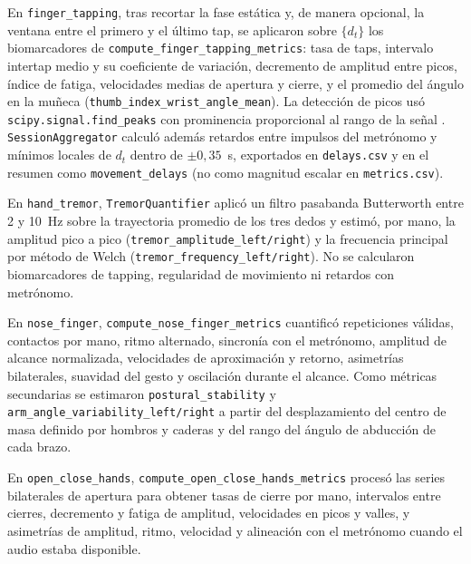 \begin{sloppypar}
En \texttt{finger\_tapping}, tras recortar la fase estática y, de manera opcional, la ventana entre el primero y el último tap, se aplicaron sobre $\{d_t\}$ los biomarcadores de \texttt{compute\_\allowbreak{}finger\_\allowbreak{}tapping\_\allowbreak{}metrics}: tasa de taps, intervalo intertap medio y su coeficiente de variación, decremento de amplitud entre picos, índice de fatiga, velocidades medias de apertura y cierre, y el promedio del ángulo en la muñeca (\texttt{thumb\_\allowbreak{}index\_\allowbreak{}wrist\_\allowbreak{}angle\_\allowbreak{}mean}). La detección de picos usó \texttt{scipy.\allowbreak{}signal.\allowbreak{}find\_\allowbreak{}peaks} con prominencia proporcional al rango de la señal \citep{sibley2021video,acevedo2025visionmd}. \texttt{SessionAggregator} calculó además retardos entre impulsos del metrónomo y mínimos locales de $d_t$ dentro de $\pm 0{,}35$~s, exportados en \texttt{delays.csv} y en el resumen como \texttt{movement\_\allowbreak{}delays} (no como magnitud escalar en \texttt{metrics.csv}).

En \texttt{hand\_tremor}, \texttt{TremorQuantifier} aplicó un filtro pasabanda Butterworth entre 2 y 10~Hz sobre la trayectoria promedio de los tres dedos y estimó, por mano, la amplitud pico a pico (\texttt{tremor\_\allowbreak{}amplitude\_\allowbreak{}left/\allowbreak{}right}) y la frecuencia principal por método de Welch (\texttt{tremor\_\allowbreak{}frequency\_\allowbreak{}left/\allowbreak{}right}). No se calcularon biomarcadores de tapping, regularidad de movimiento ni retardos con metrónomo.

En \texttt{nose\_finger}, \texttt{compute\_\allowbreak{}nose\_\allowbreak{}finger\_\allowbreak{}metrics} cuantificó repeticiones válidas, contactos por mano, ritmo alternado, sincronía con el metrónomo, amplitud de alcance normalizada, velocidades de aproximación y retorno, asimetrías bilaterales, suavidad del gesto y oscilación durante el alcance. Como métricas secundarias se estimaron \texttt{postural\_\allowbreak{}stability} y \texttt{arm\_\allowbreak{}angle\_\allowbreak{}variability\_\allowbreak{}left/\allowbreak{}right} a partir del desplazamiento del centro de masa definido por hombros y caderas y del rango del ángulo de abducción de cada brazo.

En \texttt{open\_close\_hands}, \texttt{compute\_\allowbreak{}open\_\allowbreak{}close\_\allowbreak{}hands\_\allowbreak{}metrics} procesó las series bilaterales de apertura para obtener tasas de cierre por mano, intervalos entre cierres, decremento y fatiga de amplitud, velocidades en picos y valles, y asimetrías de amplitud, ritmo, velocidad y alineación con el metrónomo cuando el audio estaba disponible.
\end{sloppypar}

